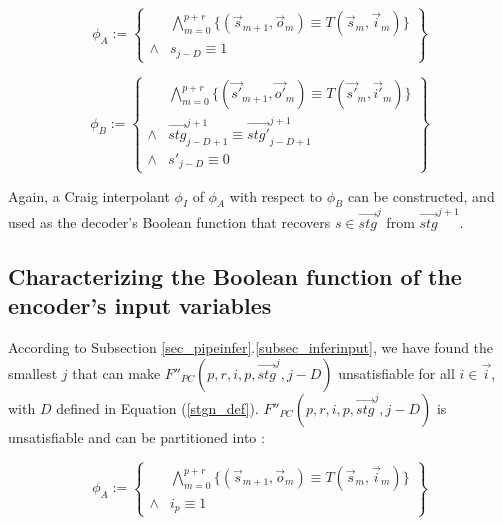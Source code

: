 \documentclass[runningheads,a4paper,orivec]{llncs}
\begin{document}
\begin{equation}
 \phi_A := 
 \left\{
\begin{array}{cc}
&\bigwedge_{m=0}^{p+r}
\{
(\vec{s}_{m+1},\vec{o}_m)\equiv T(\vec{s}_m,\vec{i}_m)
\}
\\
\wedge& s_{j-D}\equiv 1 
\end{array}
\right\}
\end{equation}

\begin{equation}
\phi_B := 
\left\{
\begin{array}{cc}
&\bigwedge_{m=0}^{p+r}
\{
(\vec{s'}_{m+1},\vec{o'}_m)\equiv T(\vec{s'}_m,\vec{i'}_m)
\}
\\
\wedge&\vec{stg}^{j+1}_{j-D+1}\equiv \vec{stg'}^{j+1}_{j-D+1} \\
\wedge& s'_{j-D}\equiv 0 
\end{array}
\right\}
\end{equation}

Again,
a Craig interpolant $\phi_I$ of $\phi_A$ with respect to $\phi_B$ can be constructed,
and used as the decoder's Boolean function that recovers $s\in \vec{stg}^{j}$ from $\vec{stg}^{j+1}$.

\subsection{Characterizing the Boolean function of the encoder's input variables}

According to Subsection \ref{sec_pipeinfer}.\ref{subsec_inferinput},
we have found the smallest $j$ that can make $F''_{PC}(p,r,i,p,\vec{stg}^{j},j-D)$ unsatisfiable for all $i\in \vec{i}$,
with $D$ defined in Equation (\ref{stgn_def}).
$F''_{PC}(p,r,i,p,\vec{stg}^{j},j-D)$ is unsatisfiable and can be partitioned into :

\begin{equation}
\phi_A:=
\left\{
\begin{array}{cc}
&\bigwedge_{m=0}^{p+r}
\{
(\vec{s}_{m+1},\vec{o}_m)\equiv T(\vec{s}_m,\vec{i}_m)
\}
\\
\wedge& i_{p}\equiv 1 
\end{array}
\right\}
\end{equation}
\end{document}
